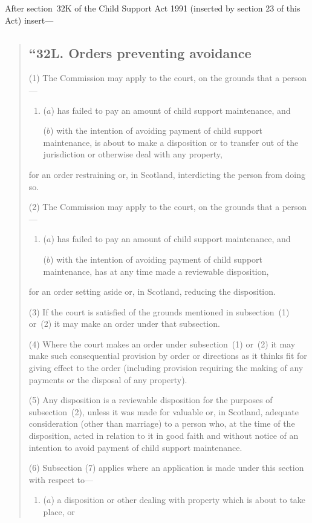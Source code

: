 \documentclass[12pt,a4paper]{article}
\begin{document}
After section~32K of the Child Support Act 1991 (inserted by section 23 of this Act) insert---
\begin{quotation}
\subsection*{``32L. Orders preventing avoidance}

(1) The Commission may apply to the court, on the grounds that a person---
\begin{enumerate}\item[]
($a$) has failed to pay an amount of child support maintenance, and

($b$) with the intention of avoiding payment of child support maintenance, is about to make a disposition or to transfer out of the jurisdiction or otherwise deal with any property,
\end{enumerate}
for an order restraining or, in Scotland, interdicting the person from doing so.

(2) The Commission may apply to the court, on the grounds that a person---
\begin{enumerate}\item[]
($a$) has failed to pay an amount of child support maintenance, and

($b$) with the intention of avoiding payment of child support maintenance, has at any time made a reviewable disposition,
\end{enumerate}
for an order setting aside or, in Scotland, reducing the disposition.

(3)
If the court is satisfied of the grounds mentioned in subsection~(1) or~(2) it may make an order under that subsection.

(4)
Where the court makes an order under subsection~(1) or~(2) it may make such consequential provision by order or directions as it thinks fit for giving effect to the order (including provision requiring the making of any payments or the disposal of any property).

(5)
Any disposition is a reviewable disposition for the purposes of subsection~(2), unless it was made for valuable or, in Scotland, adequate consideration (other than marriage) to a person who, at the time of the disposition, acted in relation to it in good faith and without notice of an intention to avoid payment of child support maintenance.

(6)
Subsection (7) applies where an application is made under this section with respect to---
\begin{enumerate}\item[]
($a$) a disposition or other dealing with property which is about to take place, or


\end{enumerate}
\end{quotation}
\end{document}
